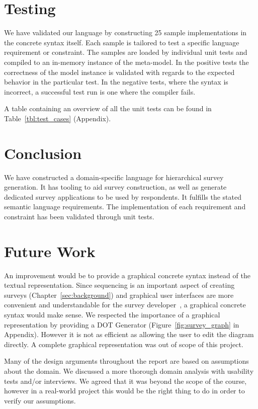 \documentclass[runningheads,a4paper]{llncs}
\begin{document}
\section{Testing}
We have validated our language by constructing 25 sample implementations in the concrete syntax itself. Each sample is tailored to test a specific language requirement or constraint. The samples are loaded by individual unit tests and compiled to an in-memory instance of the meta-model. In the positive tests the correctness of the model instance is validated with regards to the expected behavior in the particular test. In the negative tests, where the syntax is incorrect, a successful test run is one where the compiler fails.

A table containing an overview of all the unit tests can be found in Table~\ref{tbl:test_cases} (Appendix).

\section{Conclusion}
We have constructed a domain-specific language for hierarchical survey generation. It has tooling to aid survey construction, as well as generate dedicated survey applications to be used by respondents. It fulfills the stated semantic language requirements. The implementation of each requirement and constraint has been validated through unit tests.

\section{Future Work}
An improvement would be to provide a graphical concrete syntax instead of the textual representation. Since sequencing is an important aspect of creating surveys (Chapter~\ref{sec:background}) and graphical user interfaces are more convenient and understandable for the survey developer~\cite{karsai}, a graphical concrete syntax would make sense. We respected the importance of a graphical representation by providing a DOT Generator (Figure~\ref{fig:survey_graph} in Appendix). However it is not as efficient as allowing the user to edit the diagram directly. A complete graphical representation was out of scope of this project.

Many of the design arguments throughout the report are based on assumptions about the domain. We discussed a more thorough domain analysis with usability tests and/or interviews. We agreed that it was beyond the scope of the course, however in a real-world project this would be the right thing to do in order to verify our assumptions.
\end{document}
